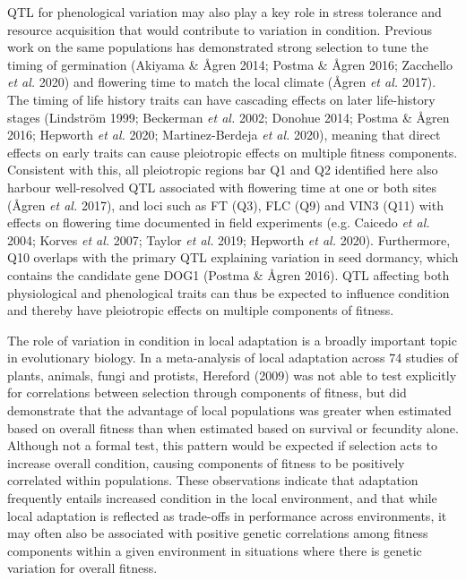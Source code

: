 \documentclass[]{article}
\begin{document}
QTL for phenological variation may also play a key role in stress tolerance and resource acquisition that would contribute to variation in condition. Previous work on the same populations has demonstrated strong selection to tune the timing of germination (Akiyama \& Ågren 2014; Postma \& Ågren 2016; Zacchello \emph{et al.} 2020) and flowering time to match the local climate (Ågren \emph{et al.} 2017). The timing of life history traits can have cascading effects on later life-history stages (Lindström 1999; Beckerman \emph{et al.} 2002; Donohue 2014; Postma \& Ågren 2016; Hepworth \emph{et al.} 2020; Martinez-Berdeja \emph{et al.} 2020), meaning that direct effects on early traits can cause pleiotropic effects on multiple fitness components. Consistent with this, all pleiotropic regions bar Q1 and Q2 identified here also harbour well-resolved QTL associated with flowering time at one or both sites (Ågren \emph{et al.} 2017), and loci such as FT (Q3), FLC (Q9) and VIN3 (Q11) with effects on flowering time documented in field experiments (e.g. Caicedo \emph{et al.} 2004; Korves \emph{et al.} 2007; Taylor \emph{et al.} 2019; Hepworth \emph{et al.} 2020). Furthermore, Q10 overlaps with the primary QTL explaining variation in seed dormancy, which contains the candidate gene DOG1 (Postma \& Ågren 2016). QTL affecting both physiological and phenological traits can thus be expected to influence condition and thereby have pleiotropic effects on multiple components of fitness.

The role of variation in condition in local adaptation is a broadly important topic in evolutionary biology. In a meta-analysis of local adaptation across 74 studies of plants, animals, fungi and protists, Hereford (2009) was not able to test explicitly for correlations between selection through components of fitness, but did demonstrate that the advantage of local populations was greater when estimated based on overall fitness than when estimated based on survival or fecundity alone. Although not a formal test, this pattern would be expected if selection acts to increase overall condition, causing components of fitness to be positively correlated within populations. These observations indicate that adaptation frequently entails increased condition in the local environment, and that while local adaptation is reflected as trade-offs in performance across environments, it may often also be associated with positive genetic correlations among fitness components within a given environment in situations where there is genetic variation for overall fitness.
\end{document}
